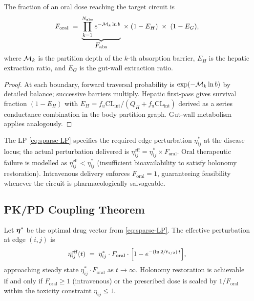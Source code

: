 \begin{proposition}
\label{prop:ch09-bioavail}
The fraction of an oral dose reaching the target circuit is
\begin{equation}
  F_{\mathrm{oral}}
  \;=\; \underbrace{\prod_{k=1}^{N_{\mathrm{abs}}} e^{-\mathcal{M}_k\ln b}}_{\displaystyle F_{\mathrm{abs}}}
  \;\times\; (1 - E_H)\;\times\;(1 - E_G),
  \label{eq:ch09-bioavail}
\end{equation}
where $\mathcal{M}_k$ is the partition depth of the $k$-th absorption barrier,
$E_H$ is the hepatic extraction ratio, and $E_G$ is the gut-wall extraction
ratio.
\end{proposition}

\begin{proof}
At each boundary, forward traversal probability is $\exp(-\mathcal{M}_k\ln b)$ by
detailed balance; successive barriers multiply.  Hepatic first-pass gives
survival fraction $(1-E_H)$ with
$E_H = f_u\mathrm{CL}_{\mathrm{int}}/(Q_H + f_u\mathrm{CL}_{\mathrm{int}})$
derived as a series conductance combination in the body partition graph.
Gut-wall metabolism applies analogously.
\end{proof}

\begin{remark}
The LP \eqref{eq:sparse-LP} specifies the required edge perturbation
$\eta_{ij}^*$ at the disease locus; the actual perturbation delivered is
$\eta_{ij}^{\mathrm{eff}} = \eta_{ij}^*\times F_{\mathrm{oral}}$.  Oral
therapeutic failure is modelled as $\eta_{ij}^{\mathrm{eff}} < \eta_{ij}^*$
(insufficient bioavailability to satisfy holonomy restoration).  Intravenous
delivery enforces $F_{\mathrm{oral}} = 1$, guaranteeing feasibility whenever
the circuit is pharmacologically salvageable.
\end{remark}

\subsection{PK/PD Coupling Theorem}
\label{subsec:ch09-pkpd-thm}

\begin{theorem}[PK/PD coupling]
\label{thm:ch09-pkpd}
Let $\boldsymbol{\eta}^*$ be the optimal drug vector from \eqref{eq:sparse-LP}.
The effective perturbation at edge $(i,j)$ is
\begin{equation}
  \eta_{ij}^{\mathrm{eff}}(t)
  \;=\;
  \eta_{ij}^*\cdot F_{\mathrm{oral}}
  \cdot\Bigl[1 - e^{-(\ln 2/t_{1/2})\,t}\Bigr],
  \label{eq:ch09-pkpd}
\end{equation}
approaching steady state $\eta_{ij}^*\cdot F_{\mathrm{oral}}$ as
$t\to\infty$.  Holonomy restoration is achievable if and only if
$F_{\mathrm{oral}} \geq 1$ (intravenous) or the prescribed dose is scaled
by $1/F_{\mathrm{oral}}$ within the toxicity constraint $\eta_{ij}\leq 1$.
\end{theorem}


